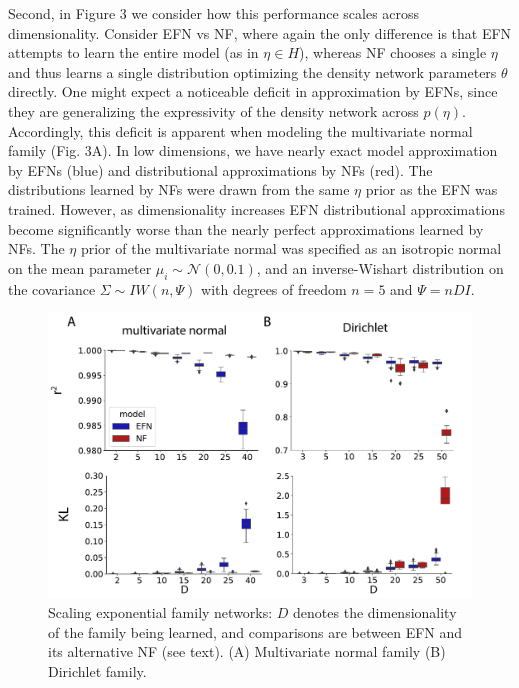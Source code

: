\documentclass[twoside]{article}
\begin{document}
Second, in Figure 3 we consider how this performance scales across dimensionality.  Consider EFN vs NF, where again the only difference is that EFN attempts to learn the entire model (as in $\eta \in H$), whereas NF chooses a single $\eta$ and thus learns a single distribution optimizing the density network parameters $\theta$ directly.  One might expect a noticeable deficit in approximation by EFNs, since they are generalizing the expressivity of the density network across $p(\eta)$.  Accordingly, this deficit is apparent when modeling the multivariate normal family (Fig. 3A).  In low dimensions, we have nearly exact model approximation by EFNs (blue) and distributional approximations by NFs (red).  The distributions learned by NFs were drawn from the same $\eta$ prior as the EFN was trained.  However, as dimensionality increases EFN distributional approximations become significantly worse than the nearly perfect approximations learned by NFs.  The $\eta$ prior of the multivariate normal was specified as an isotropic normal on the mean parameter $\mu_i \sim \mathcal{N}(0, 0.1)$, and an inverse-Wishart distribution on the covariance $\Sigma \sim IW(n, \Psi)$ with degrees of freedom $n=5$ and $\Psi = nD I$.

%
 \begin{figure}
  \centering
\includegraphics[width=1.0\linewidth]{figs/fig3/fig3.pdf}
  \caption{Scaling exponential family networks: $D$ denotes the dimensionality of the family being learned, and comparisons are between EFN and its alternative NF (see text).  (A) Multivariate normal family (B) Dirichlet family.}
\end{figure}
%
\end{document}
